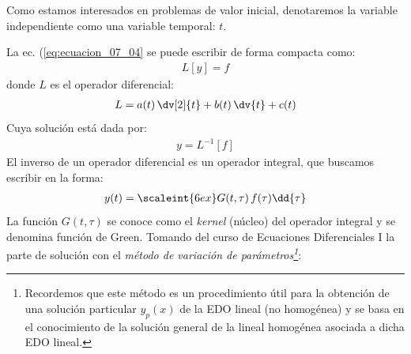 Como estamos interesados en problemas de valor inicial, denotaremos la variable independiente como una variable temporal: $t$.
\par
La ec. (\ref{eq:ecuacion_07_04} se puede escribir de forma compacta como:
\begin{align*}
L [y] = f
\end{align*}
donde $L$ es el operador diferencial:
\begin{align*}
L = a (t) \, \dv[2]{t} + b (t) \, \dv{t} + c (t) 
\end{align*}
Cuya solución está dada por:
\begin{align*}
y = L^{-1} [f]
\end{align*}
El inverso de un operador diferencial es un operador integral, que buscamos escribir en la forma:
\begin{align*}
y (t) = \scaleint{6ex} G (t, \tau) \, f(\tau) \dd{\tau}
\end{align*}
La función $G (t, \tau)$ se conoce como el  \emph{kernel} (núcleo) del operador integral y  se denomina función de Green.
\newpage
Tomando del curso de Ecuaciones Diferenciales I la parte de solución con el \emph{método de variación de parámetros\footnote{Recordemos que este método es un procedimiento útil para la obtención de una solución particular
$y_{p} (x)$ de la EDO lineal (no homogénea) y se basa en el conocimiento de la solución general de la lineal homogénea asociada a dicha EDO lineal.}}:
